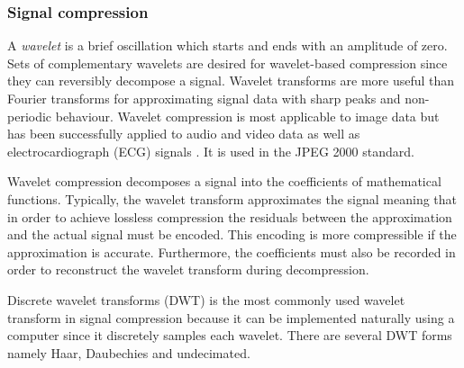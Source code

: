 \subsubsection{Signal compression}

A \textit{wavelet} is a brief oscillation which starts and ends with an
amplitude of zero. Sets of complementary wavelets are desired for wavelet-based
compression since they can reversibly decompose a signal. Wavelet transforms are
more useful than Fourier transforms for approximating signal data with sharp
peaks and non-periodic behaviour. Wavelet compression is most applicable to
image data but has been successfully applied to audio and video data as well as
electrocardiograph (ECG) signals \cite{ecg}. It is used in the JPEG 2000 standard.

Wavelet compression decomposes a signal into the coefficients of mathematical
functions.
Typically, the wavelet transform approximates the signal meaning that in order
to achieve lossless compression the residuals between the approximation and the
actual signal must be encoded. This encoding is more compressible if the
approximation is accurate. Furthermore, the coefficients must also be recorded
in order to reconstruct the wavelet transform during decompression.

Discrete wavelet transforms (DWT) is the most commonly used wavelet transform in
signal compression because it can be implemented naturally using a computer
since it discretely samples each wavelet. There are several DWT forms namely
Haar, Daubechies and undecimated.
